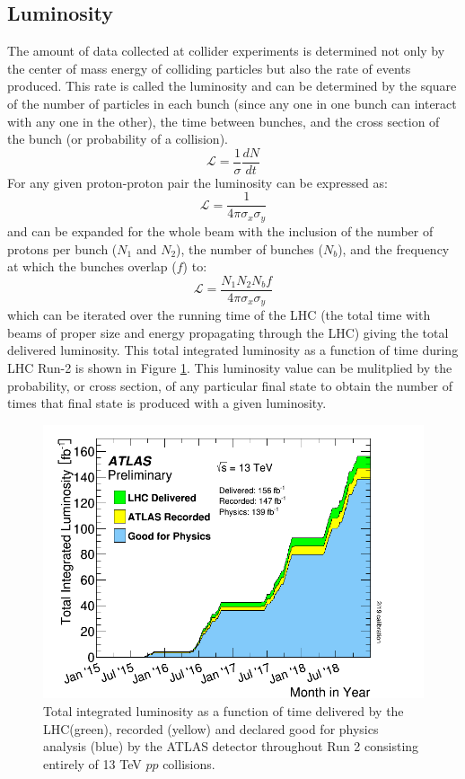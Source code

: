 \subsection{Luminosity}
The amount of data collected at collider experiments is determined not only by the center of mass energy of colliding particles but also the rate of events produced.  This rate is called the luminosity and can be determined by the square of the number of particles in each bunch (since any one in one bunch can interact with any one in the other), the time between bunches, and the cross section of the bunch (or probability of a collision).
\[ \mathcal{L}=\frac{1}{\sigma}\frac{dN}{dt} \]
For any given proton-proton pair the luminosity can be expressed as:
\[ \mathcal{L}=\frac{1}{4\pi \sigma_x \sigma_y} \]
and can be expanded for the whole beam with the inclusion of the number of protons per bunch ($N_1$ and $N_2$), the number of bunches ($N_b$), and the frequency at which the bunches overlap ($f$) to:
\[ \mathcal{L}=\frac{N_1 N_2 N_b f}{4 \pi \sigma_x \sigma_y} \]
which can be iterated over the running time of the LHC (the total time with beams of proper size and energy propagating through the LHC) giving the total delivered luminosity.  This total integrated luminosity as a function of time during LHC Run-2 is shown in Figure \ref{fig:ATLASLumi}.  This luminosity value can be mulitplied by the probability, or cross section, of any particular final state to obtain the number of times that final state is produced with a given luminosity.
\begin{figure}[h!]
	\centering
	\includegraphics[width=.7\columnwidth]{../ThesisImages/LHCImages/ATLASLumi.png}
	\caption[Total integrated luminosity as a function of time delivered by the LHC(green), recorded (yellow) and declared good for physics analysis (blue) by the ATLAS detector throughout Run 2 consisting entirely of 13 TeV $pp$ collisions.]{Total integrated luminosity as a function of time delivered by the LHC(green), recorded (yellow) and declared good for physics analysis (blue) by the ATLAS detector throughout Run 2 consisting entirely of 13 TeV $pp$ collisions. \cite{ATLASLumi}}
	\label{fig:ATLASLumi}
\end{figure}


